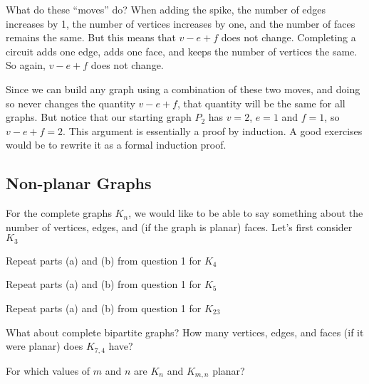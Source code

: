 \documentclass[12pt]{article}
\begin{document}
What do these ``moves'' do?  When adding the spike, the number of edges increases by 1, the number of vertices increases by one, and the number of faces remains the same.  But this means that $v - e + f$ does not change.  Completing a circuit adds one edge, adds one face, and keeps the number of vertices the same.  So again, $v - e + f$ does not change.  

Since we can build any graph using a combination of these two moves, and doing so never changes the quantity $v - e + f$, that quantity will be the same for all graphs.  But notice that our starting graph $P_2$ has $v = 2$, $e = 1$ and $f = 1$, so $v - e + f = 2$.  This argument is essentially a proof by induction.  A good exercises would be to rewrite it as a formal induction proof.

\subsection{Non-planar Graphs}

\begin{activity}
\begin{questions}
\question For the complete graphs $K_n$, we would like to be able to say something about the number of vertices, edges, and (if the graph is planar) faces. Let's first consider $K_3$
\question Repeat parts (a) and (b) from question 1 for $K_4$ 

\question Repeat parts (a) and (b) from question 1 for $K_5$

\question Repeat parts (a) and (b) from question 1 for $K_{23}$


\question What about complete bipartite graphs?  How many vertices, edges, and faces (if it were planar) does $K_{7,4}$ have?

\question For which values of $m$ and $n$ are $K_n$ and $K_{m,n}$ planar?
\end{questions}
\end{activity}
\end{document}
